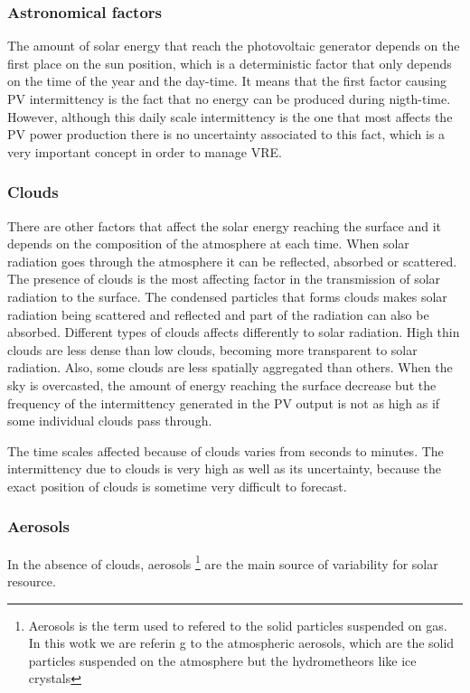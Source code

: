 \subsubsection{Astronomical factors}

The amount of solar energy that reach the photovoltaic generator depends on the first place on the sun position, which is a deterministic factor that only depends on the time of the year and the day-time. It means that the first factor causing PV intermittency is the fact that no energy can be produced during nigth-time. However, although this daily scale intermittency is the one that most affects the PV power production there is no uncertainty associated to this fact, which is a very important concept in order to manage VRE.

\subsubsection{Clouds}

There are other factors that affect the solar energy reaching the surface and it depends on the composition of the atmosphere at each time. When solar radiation goes through the atmosphere it can be reflected, absorbed or scattered. The presence of clouds is the most affecting factor in the transmission of solar radiation to the surface. The condensed particles that forms clouds makes solar radiation being scattered and reflected and part of the radiation can also be absorbed. Different types of clouds affects differently to solar radiation. High thin clouds are less dense than low clouds, becoming more transparent to solar radiation. Also, some clouds are less spatially aggregated than others. When the sky is overcasted, the amount of energy reaching the surface decrease but the frequency of the intermittency generated in the PV output is not as high as if some individual clouds pass through.

The time scales affected because of clouds varies from seconds to minutes. The intermittency due to clouds is very high as well as its uncertainty, because the exact position of clouds is sometime very difficult to forecast.

\subsubsection{Aerosols}

In the absence of clouds, aerosols \footnote{Aerosols is the term used to refered to the solid particles suspended on gas. In this wotk we are referin g to the atmospheric aerosols, which are the solid particles suspended on the atmosphere but the hydrometheors like ice crystals} are the main source of variability for solar resource. 

